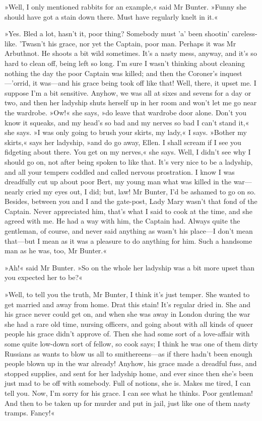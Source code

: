 »Well, I only mentioned rabbits for an example,« said Mr Bunter.  »Funny she should have got a stain down there. Must have regularly knelt in it.«

»Yes. Bled a lot, hasn't it, poor thing? Somebody must 'a' been shootin' careless-like. 'Twasn't his grace, nor yet the Captain, poor man. Perhaps it was Mr Arbuthnot. He shoots a bit wild sometimes.  It's a nasty mess, anyway, and it's so hard to clean off, being left so long. I'm sure I wasn't thinking about cleaning nothing the day the poor Captain was killed; and then the Coroner's inquest---'orrid, it was\allowbreak---\allowbreak and his grace being took off like that! Well, there, it upset me.  I suppose I'm a bit sensitive. Anyhow, we was all at sixes and sevens for a day or two, and then her ladyship shuts herself up in her room and won't let me go near the wardrobe. »Ow!« she says, »do leave that wardrobe door alone. Don't you know it squeaks, and my head's so bad and my nerves so bad I can't stand it,« she says. »I was only going to brush your skirts, my lady,« I says. »Bother my skirts,« says her ladyship, »and do go away, Ellen. I shall scream if I see you fidgeting about there. You get on my nerves,« she says. Well, I didn't see why I should go on, not after being spoken to like that. It's very nice to be a ladyship, and all your tempers coddled and called nervous prostration. I know I was dreadfully cut up about poor Bert, my young man what was killed in the war\allowbreak---\allowbreak nearly cried my eyes out, I did; but, law! Mr Bunter, I'd be ashamed to go on so. Besides, between you and I and the gate-post, Lady Mary wasn't that fond of the Captain. Never appreciated him, that's what I said to cook at the time, and she agreed with me. He had a way with him, the Captain had. Always quite the gentleman, of course, and never said anything as wasn't his place\allowbreak---\allowbreak I don't mean that\allowbreak---\allowbreak but I mean as it was a pleasure to do anything for him. Such a handsome man as he was, too, Mr Bunter.«

»Ah!« said Mr Bunter. »So on the whole her ladyship was a bit more upset than you expected her to be?«

»Well, to tell you the truth, Mr Bunter, I think it's just temper. She wanted to get married and away from home. Drat this stain! It's regular dried in. She and his grace never could get on, and when she was away in London during the war she had a rare old time, nursing officers, and going about with all kinds of queer people his grace didn't approve of.  Then she had some sort of a love-affair with some quite low-down sort of fellow, so cook says; I think he was one of them dirty Russians as wants to blow us all to smithereens\allowbreak---\allowbreak as if there hadn't been enough people blown up in the war already! Anyhow, his grace made a dreadful fuss, and stopped supplies, and sent for her ladyship home, and ever since then she's been just mad to be off with somebody. Full of notions, she is. Makes me tired, I can tell you. Now, I'm sorry for his grace. I can see what he thinks. Poor gentleman! And then to be taken up for murder and put in jail, just like one of them nasty tramps.  Fancy!«


